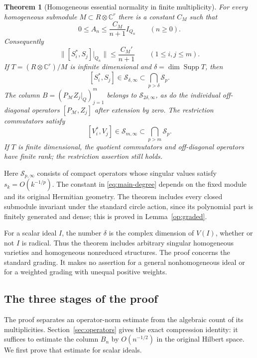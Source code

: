 \documentclass[11pt,reqno]{amsart}
\numberwithin{equation}{section}
\newtheorem{thmA}{Theorem}\renewcommand{\thethmA}{A}
\theoremstyle{definition}
\theoremstyle{remark}
\newcommand{\C}{\mathbb C}
\newcommand{\cS}{\mathcal S}
\DeclareMathOperator{\Supp}{Supp}
\begin{document}
\begin{thmA}[Homogeneous essential normality in finite multiplicity]\label{thm:main}
For every homogeneous submodule $M\subset R\otimes\C^r$ there is a
constant $C_M$ such that
\begin{equation}\label{eq:main-degree}
 0\le A_n\le\frac{C_M}{n+1}I_{Q_n}\qquad(n\ge0).
\end{equation}
Consequently
\begin{equation}\label{eq:main-commutator}
 \|[S_i^*,S_j]|_{Q_n}\|\le\frac{C_M'}{n+1}
 \qquad(1\le i,j\le m).
\end{equation}
If $T=(R\otimes\C^r)/M$ is infinite dimensional and
$\delta=\dim\Supp T$, then
\[
 [S_i^*,S_j]\in\cS_{\delta,\infty}\subset\bigcap_{p>\delta}\cS_p.
\]
The column $B=(P_{\mathcal M}Z_j|_Q)_{j=1}^m$ belongs to
$\cS_{2\delta,\infty}$, as do the individual off-diagonal operators
$[P_{\mathcal M},Z_j]$ after extension by zero.  The restriction
commutators satisfy
\[
 [V_i^*,V_j]\in\cS_{m,\infty}\subset\bigcap_{p>m}\cS_p.
\]
If $T$ is finite dimensional, the quotient commutators and off-diagonal
operators have finite rank; the restriction assertion still holds.
\end{thmA}

Here $\cS_{p,\infty}$ consists of compact operators whose singular values
satisfy $s_k=O(k^{-1/p})$.  The constant in
\eqref{eq:main-degree} depends on the fixed module and its original
Hermitian geometry.  The theorem includes every closed submodule invariant
under the standard circle action, since its polynomial part is finitely
generated and dense; this is proved in Lemma~\ref{op:graded}.

For a scalar ideal $I$, the number $\delta$ is the complex dimension of
$V(I)$, whether or not $I$ is radical.  Thus the theorem includes arbitrary
singular homogeneous varieties and homogeneous nonreduced structures.
The proof concerns the standard grading.  It makes no assertion for a
general nonhomogeneous ideal or for a weighted grading with unequal positive
weights.

\subsection{The three stages of the proof}
The proof separates an operator-norm estimate from the algebraic count of
its multiplicities. Section~\ref{sec:operators} gives the exact compression
identity: it suffices to estimate the column $B_n$ by $O(n^{-1/2})$ in the
original Hilbert space. We first prove that estimate for scalar ideals.
\end{document}
